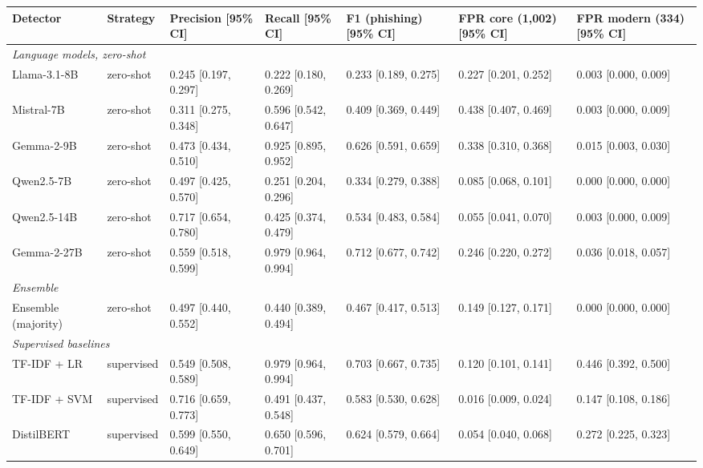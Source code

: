\begin{tabular}{lllllll}
\toprule
Detector & Strategy & Precision [95\% CI] & Recall [95\% CI] & F1 (phishing) [95\% CI] & FPR core (1,002) [95\% CI] & FPR modern (334) [95\% CI] \\
\midrule
\multicolumn{7}{l}{\textit{Language models, zero-shot}} \\
Llama-3.1-8B & zero-shot & 0.245 [0.197, 0.297] & 0.222 [0.180, 0.269] & 0.233 [0.189, 0.275] & 0.227 [0.201, 0.252] & 0.003 [0.000, 0.009] \\
Mistral-7B & zero-shot & 0.311 [0.275, 0.348] & 0.596 [0.542, 0.647] & 0.409 [0.369, 0.449] & 0.438 [0.407, 0.469] & 0.003 [0.000, 0.009] \\
Gemma-2-9B & zero-shot & 0.473 [0.434, 0.510] & 0.925 [0.895, 0.952] & 0.626 [0.591, 0.659] & 0.338 [0.310, 0.368] & 0.015 [0.003, 0.030] \\
Qwen2.5-7B & zero-shot & 0.497 [0.425, 0.570] & 0.251 [0.204, 0.296] & 0.334 [0.279, 0.388] & 0.085 [0.068, 0.101] & 0.000 [0.000, 0.000] \\
Qwen2.5-14B & zero-shot & 0.717 [0.654, 0.780] & 0.425 [0.374, 0.479] & 0.534 [0.483, 0.584] & 0.055 [0.041, 0.070] & 0.003 [0.000, 0.009] \\
Gemma-2-27B & zero-shot & 0.559 [0.518, 0.599] & 0.979 [0.964, 0.994] & 0.712 [0.677, 0.742] & 0.246 [0.220, 0.272] & 0.036 [0.018, 0.057] \\
\midrule
\multicolumn{7}{l}{\textit{Ensemble}} \\
Ensemble (majority) & zero-shot & 0.497 [0.440, 0.552] & 0.440 [0.389, 0.494] & 0.467 [0.417, 0.513] & 0.149 [0.127, 0.171] & 0.000 [0.000, 0.000] \\
\midrule
\multicolumn{7}{l}{\textit{Supervised baselines}} \\
TF-IDF + LR & supervised & 0.549 [0.508, 0.589] & 0.979 [0.964, 0.994] & 0.703 [0.667, 0.735] & 0.120 [0.101, 0.141] & 0.446 [0.392, 0.500] \\
TF-IDF + SVM & supervised & 0.716 [0.659, 0.773] & 0.491 [0.437, 0.548] & 0.583 [0.530, 0.628] & 0.016 [0.009, 0.024] & 0.147 [0.108, 0.186] \\
DistilBERT & supervised & 0.599 [0.550, 0.649] & 0.650 [0.596, 0.701] & 0.624 [0.579, 0.664] & 0.054 [0.040, 0.068] & 0.272 [0.225, 0.323] \\
\bottomrule
\end{tabular}
